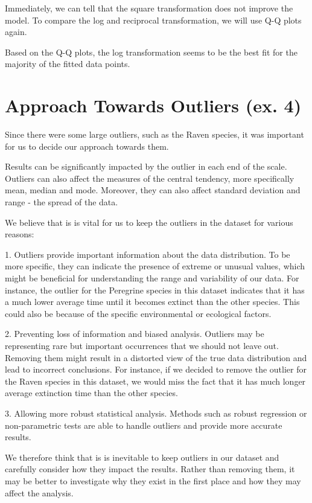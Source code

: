 \documentclass{article}
\begin{document}
Immediately, we can tell that the square transformation does not improve the model. To compare the log and reciprocal transformation, we will use Q-Q plots again.

Based on the Q-Q plots, the log transformation seems to be the best fit for the majority of the fitted data points.

\section{Approach Towards Outliers (ex. 4)}
Since there were some large outliers, such as the Raven species, it was important for us to decide our approach towards them.

Results can be significantly impacted by the outlier in each end of the scale. Outliers can also affect the measures of the central tendency, more specifically mean, median and mode. Moreover, they can also affect standard deviation and range - the spread of the data.

We believe that is is vital for us to keep the outliers in the dataset for various reasons:

1. Outliers provide important information about the data distribution. To be more specific, they can indicate the presence of extreme or unusual values, which might be beneficial for understanding the range and variability of our data. For instance,  the outlier for the Peregrine species in this dataset indicates that it has a much lower average time until it becomes extinct than the other species. This could also be because of the specific environmental or ecological factors.

2. Preventing loss of information and biased analysis. Outliers may be representing rare but important occurrences that we should not leave out. Removing them might result in a distorted view of the true data distribution and lead to incorrect conclusions. For instance, if we decided to remove the outlier for the Raven species in this dataset, we would miss the fact that it has much longer average extinction time than the other species.

3. Allowing more robust statistical analysis. Methods such as robust regression or non-parametric tests are able to handle outliers and provide more accurate results.

We therefore think that is is inevitable to keep outliers in our dataset and carefully consider how they impact the results. Rather than removing them, it may be better to investigate why they exist in the first place and how they may affect the analysis.
\end{document}
